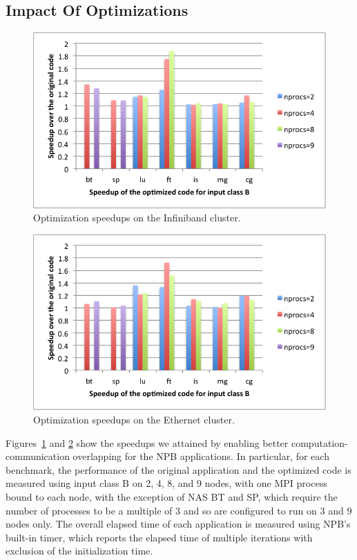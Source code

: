 \subsection{Impact Of Optimizations}
\begin{figure}
{\scriptsize
\centering
\includegraphics[width=.48\textwidth]{fig/blues/npb_blues_B.png}
\caption{Optimization speedups on the Infiniband cluster.}
\label{fig:npb:x86}
}%
\end{figure}
\begin{figure}
{\scriptsize
\centering
\includegraphics[width=.48\textwidth]{fig/disco/npb_disco_B.png}
\caption{Optimization speedups on the Ethernet cluster.}
\label{fig:npb:x64}
}
\end{figure}


Figures~\ref{fig:npb:x86} and \ref{fig:npb:x64}
show the speedups we attained by enabling better computation-communication overlapping for the NPB applications.
In particular, for each benchmark, the performance of the original application and the optimized code is measured using input class B on 2, 4, 8, and 9 nodes,  with one MPI process bound to each node, 
with the exception of NAS BT and SP, which require the number of processes to be a multiple of 3 and so are configured to run on 3 and 9 nodes only.
The overall elapsed time of each application is measured using NPB's built-in timer, which reports the elapsed time of multiple iterations with exclusion of the initialization time.


